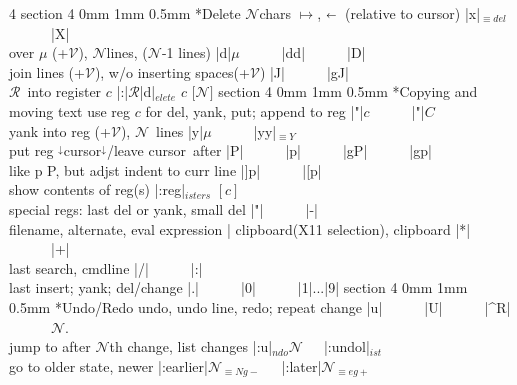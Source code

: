 \documentclass[10pt,a4paper,landscape]{article}
\makeatletter
\renewcommand{\subsection}{\@startsection
	{section}
	{4}
	{0mm}
	{1mm}
	{0.5mm}
	{\normalfont\bfseries\scriptsize}}
\newcommand{\toleft}{$\shortleftarrow$}
\newcommand{\toend}{{\small\ForwardToEnd}}
\newcommand{\eqv}[1]{$_{\equiv #1}$}
\newcommand{\opt}[1]{$_{#1}$}
\newcommand{\after}[1]{#1$^\downarrow$}
\newcommand{\before}[1]{ $^\downarrow$#1}
\newcommand{\N}{{\footnotesize$\mathcal{N}$}}
\newcommand{\R}{{\footnotesize$\mathcal{R}$}}
\newcommand{\V}{{\footnotesize$\mathcal{V}$}}
\newcommand{\w}{{~~~}}
\newcommand{\indy}{\hspace*{0.5cm}}
\newcommand{\next}{{\small\leftpointright}}
\makeatother
\begin{document}
\begin{multicols}{4}
{{\subsection*{Delete}
\N chars $\mapsto$, \toleft~(relative to cursor)    \dotfill|x|\eqv{del}\w\w|X|\\
over $\mu$ (+\V), \N lines, \toend (\N-1 lines)	    \dotfill|d|$\mu$\w\w|dd|\w\w|D|\\
join lines (+\V), w/o inserting spaces(+\V)	    \dotfill|J|\w\w|gJ|\\
\R~into register $c$				    \dotfill|:|\R|d|\opt{elete} $c$ $[$\N$]$
\subsection*{Copying and moving text}
use reg $c$ for \next del, yank, put; append to reg	\dotfill|"|$c$\w\w|"|$C$\\
yank into reg (+\V), \N~lines				\dotfill|y|$\mu$\w\w|yy|\eqv{Y}\\
put reg \before{cursor}\after{}/leave cursor~after	\dotfill|P|\w\w|p|\w\w|gP|\w\w|gp|\\
like p P, but adjst indent to curr line			\dotfill|]p|\w\w|[p|\\
show contents of reg(s)					\dotfill|:reg|\opt{isters} $[c]$\\
special regs: last del or yank, small del   \dotfill|"|\w\w|-|\\
{\indy}filename, alternate, eval expression \dotfill|%
{\indy}clipboard(X11 selection), clipboard  \dotfill|*|\w\w|+|\\
{\indy}last search, cmdline		    \dotfill|/|\w\w|:|\\
{\indy}last insert; yank; del/change	    \dotfill|.|\w\w|0|\w\w|1|...|9|
\subsection*{Undo/Redo}
undo, undo line, redo; repeat change		\dotfill|u|\w\w|U|\w\w|^R|\w\w\N.\\
jump to after {\N}th change, list changes	\dotfill|:u|\opt{ndo}\N\w|:undol|\opt{ist}\\
go to older state, newer			\dotfill|:earlier|\N\eqv{Ng-}\w|:later|\N\eqv{eg+}
}}
\end{multicols}
\end{document}
